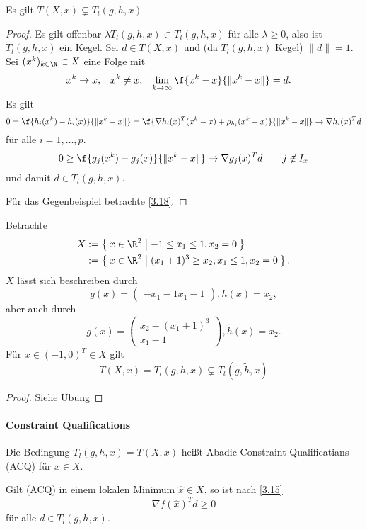 \begin{lem} \label{3.17}
	Es gilt $T(X, x) \subsetneq T_l(g,h,x)$.
	\begin{proof}
		Es gilt offenbar $\lambda T_l(g,h,x) \subset T_l(g,h,x)$ für alle $\lambda \ge 0$, also ist $T_l(g,h,x)$ ein Kegel.
		Sei $d \in T(X,x)$ und \oBdA (da $T_l(g,h,x)$ Kegel) $\|d\| = 1$.
		Sei $(x^k)_{k\in \N} \subset X$ eine Folge mit
		\begin{align*}
			x^k &\to x, &
			x^k &\neq x, &
			\lim_{k\to\infty} \f{x^k - x}{\|x^k-x\|} &= d.
		\end{align*}
		Es gilt
		\[
			0
			= \f{h_i(x^k) - h_i(x)}{\|x^k - x\|}
			= \f{\nabla h_i(x)^T(x^k-x) + \rho_{h_i}(x^k-x)}{\|x^k-x\|}
			\to \nabla h_i(x)^T d
		\]
		für alle $i = 1, \dotsc, p$.
		\[
			0
			\ge \f{g_j(x^k) - g_j(x)}{\|x^k-x\|}
			\to \nabla g_j(x)^T d
			\qquad j \not\in I_x
		\]
		und damit $d \in T_l(g,h,x)$.

		Für das Gegenbeispiel betrachte \ref{3.18}.
	\end{proof}
\end{lem}

\begin{ex} \label{3.18}
	Betrachte
	\begin{align*}
		X &:= \Set{ x \in \R^2 | -1 \le x_1 \le 1, x_2 = 0 } \\
		&:= \Set{ x \in \R^2 | (x_1 + 1)^3 \ge x_2, x_1 \le 1, x_2 = 0 }.
	\end{align*}
	$X$ lässt sich beschreiben durch
	\[
		g(x) = \begin{pmatrix}
			- x_1 - 1
			x_1 - 1
		\end{pmatrix},
		h(x) = x_2,
	\]
	aber auch durch
	\[
		\tilde g(x) = \begin{pmatrix}
			x_2 - (x_1 + 1)^3 \\
			x_1 - 1
		\end{pmatrix},
		\tilde h(x) = x_2.
	\]
	Für $x \in (-1, 0)^T \in X$ gilt
	\[
		T(X, x) = T_l(g,h,x) \subsetneq T_l(\tilde g, \tilde h, x)
	\]
	\begin{proof}
		Siehe Übung
	\end{proof}
\end{ex}

\paragraph{Constraint Qualifications}

\begin{df} \label{3.19}
	Die Bedingung $T_l(g,h,x) = T(X,x) \label{acq}$ heißt Abadic Constraint Qualificatians (ACQ) für $x \in X$.

	Gilt (ACQ) in einem lokalen Minimum $\hat x \in X$, so ist nach \ref{3.15}
	\[
		\nabla f(\hat x)^T d \ge 0
	\]
	für alle $d \in T_l(g,h,x)$.
\end{df}

